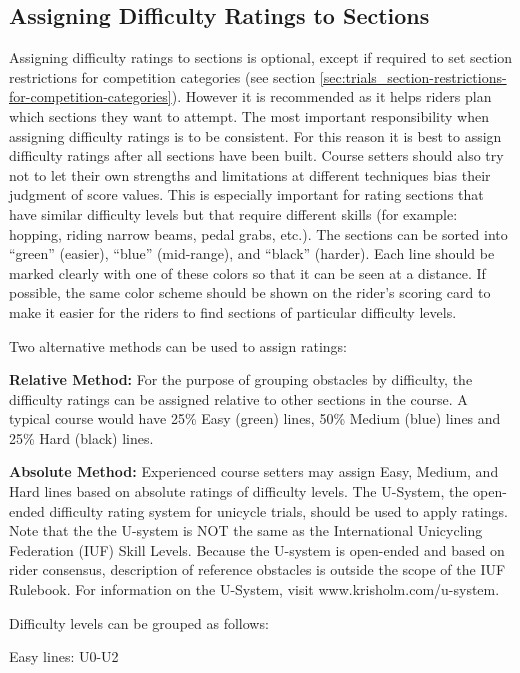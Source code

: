 \subsection{Assigning Difficulty Ratings to Sections \label{subsec:trials_guidelines-for-course-setters_assigning-difficulty-ratings}}
Assigning difficulty ratings to sections is optional, except if required to set section restrictions for competition categories (see section \ref{sec:trials_section-restrictions-for-competition-categories}).
However it is recommended as it helps riders plan which sections they want to attempt.
The most important responsibility when assigning difficulty ratings is to be consistent.
For this reason it is best to assign difficulty ratings after all sections have been built.
Course setters should also try not to let their own strengths and limitations at different techniques bias their judgment of score values.
This is especially important for rating sections that have similar difficulty levels but that require different skills (for example: hopping, riding narrow beams, pedal grabs, etc.).
The sections can be sorted into ``green'' (easier), ``blue'' (mid-range), and ``black'' (harder).
Each line should be marked clearly with one of these colors so that it can be seen at a distance.
If possible, the same color scheme should be shown on the rider's scoring card to make it easier for the riders to find sections of particular difficulty levels.

Two alternative methods can be used to assign ratings:

\textbf{Relative Method:}
For the purpose of grouping obstacles by difficulty, the difficulty ratings can be assigned relative to other sections in the course.
A typical course would have 25\% Easy (green) lines, 50\% Medium (blue) lines and 25\% Hard (black) lines.

\textbf{Absolute Method:}
Experienced course setters may assign Easy, Medium, and Hard lines based on absolute ratings of difficulty levels.
The U-System, the open-ended difficulty rating system for unicycle trials, should be used to apply ratings.
Note that the the U-system is NOT the same as the International Unicycling Federation (IUF) Skill Levels.
Because the U-system is open-ended and based on rider consensus, description of reference obstacles is outside the scope of the IUF Rulebook.
For information on the U-System, visit www.krisholm.com/u-system.

Difficulty levels can be grouped as follows:

Easy lines: U0-U2

